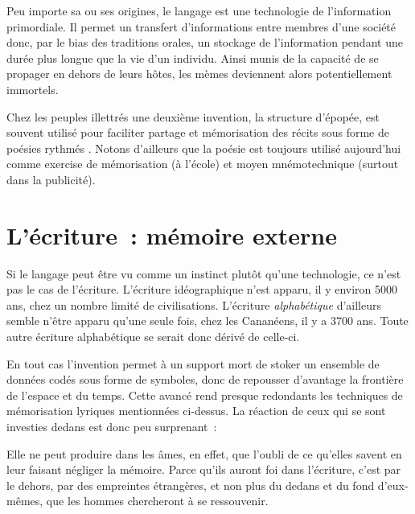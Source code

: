 Peu importe sa ou ses origines, le langage est une technologie de l'information primordiale. Il permet un transfert d'informations entre membres d'une société donc, par le bias des traditions orales, un stockage de l'information pendant une durée plus longue que la vie d'un individu. Ainsi munis de la capacité de se propager en dehors de leurs hôtes, les mèmes deviennent alors potentiellement immortels.

Chez les peuples illettrés une deuxième invention, la structure d'épopée, est souvent utilisé pour faciliter partage et mémorisation des récits sous forme de poésies rythmés \cite{havelock-preface-plato}. Notons d'ailleurs que la poésie est toujours utilisé aujourd'hui comme exercise de mémorisation (à l'école) et moyen mnémotechnique (surtout dans la publicité).

\chapter{L'écriture~: mémoire externe}
Si le langage peut être vu comme un instinct plutôt qu'une technologie, ce n'est pas le cas de l'écriture. L'écriture idéographique n'est apparu, il y environ 5000 ans, chez un nombre limité de civilisations. L'écriture \emph{alphabétique} d'ailleurs semble n'être apparu qu'une seule fois, chez les Cananéens, il y a 3700 ans\cite{linguistics-pinker}. Toute autre écriture alphabétique se serait donc dérivé de celle-ci.

En tout cas l'invention permet à un support mort de stoker un ensemble de données codés sous forme de symboles, donc de repousser d'avantage la frontière de l'espace et du temps. Cette avancé rend presque redondants les techniques de mémorisation lyriques mentionnées ci-dessus. La réaction de ceux qui se sont investies dedans est donc peu surprenant~:

\begin{coolquote}
Elle ne peut produire dans les âmes, en effet, que l’oubli de ce qu’elles  savent en leur faisant négliger la mémoire. Parce qu’ils auront foi dans  l’écriture, c’est par le dehors, par des empreintes étrangères, et non plus du dedans et du fond d’eux-mêmes, que les hommes chercheront à se ressouvenir. 
\end{coolquote}

